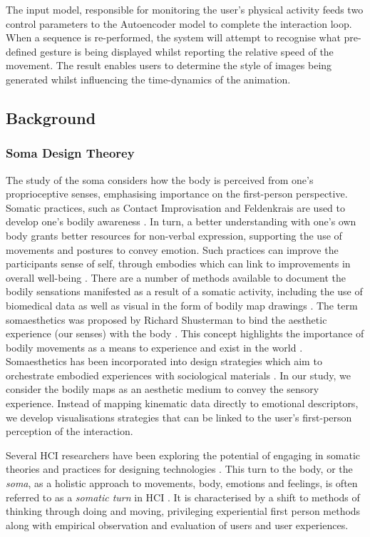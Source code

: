 The input model, responsible for monitoring the user’s physical activity feeds two control parameters to the Autoencoder model to complete the interaction loop. When a sequence is re-performed, the system will attempt to recognise what pre-defined gesture is being displayed whilst reporting the relative speed of the movement. The result enables users to determine the style of images being generated whilst influencing the time-dynamics of the animation.

\subsection{Background}

\subsubsection{Soma Design Theorey}
The study of the soma considers how the body is perceived from one's proprioceptive senses, emphasising importance on the first-person perspective\cite{hook_embracing_2018}. Somatic practices, such as Contact Improvisation and Feldenkrais are used to develop one’s bodily awareness \cite{tsaknaki_teaching_2019}. In turn, a better understanding with one's own body grants better resources for non-verbal expression, supporting the use of movements and postures to convey emotion. Such practices can improve the participants sense of self, through embodies which can link to improvements in overall well-being \cite{samaritter_aesthetic_2018}. There are a number of methods available to document the bodily sensations manifested as a result of a somatic activity, including the use of biomedical data \cite{hook_soma_2019} as well as visual in the form of bodily map drawings \cite{windlin_soma_2019}. The term somaesthetics was proposed by Richard Shusterman to bind the aesthetic experience (our senses) with the body \cite{hook_somaesthetic_2016}. This concept highlights the importance of bodily movements as a means to experience and exist in the world \cite{shusterman_body_2008}. Somaesthetics has been incorporated into design strategies which aim to orchestrate embodied experiences with sociological materials \cite{tsaknaki_teaching_2019}. In our study, we consider the bodily maps as an aesthetic medium to convey the sensory experience. Instead of mapping kinematic data directly to emotional descriptors, we develop visualisations strategies that can be linked to the user's first-person perception of the interaction. 

Several HCI researchers have been exploring the potential of engaging in somatic theories and practices for designing technologies \cite{hook_somaesthetic_2016}. This turn to the body, or the \textit{soma}, as a holistic approach to movements, body, emotions and feelings, is often referred to as a \textit{somatic turn} in HCI \cite{loke_somatic_2018}. It is characterised by a shift to methods of thinking through doing and moving, privileging experiential first person methods \cite{hook_embracing_2018} along with empirical observation and evaluation of users and user experiences. 

